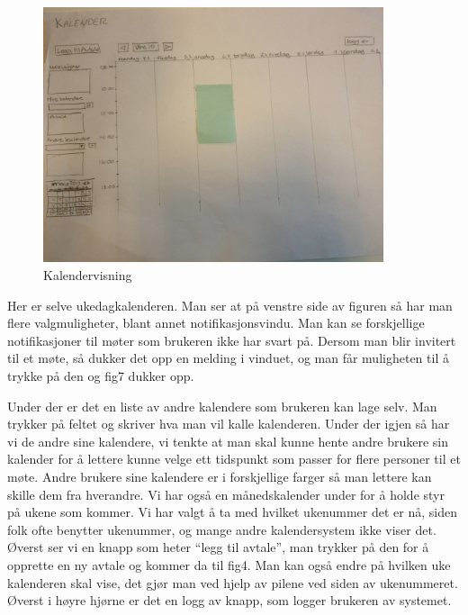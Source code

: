 \begin{figure}[ht!]
\includegraphics[width=100mm]{fig3.jpg}
\caption{Kalendervisning}
\end{figure}
Her er selve ukedagkalenderen. Man ser at på venstre side av figuren så har man flere valgmuligheter, blant annet notifikasjonsvindu. Man kan se forskjellige notifikasjoner til møter som brukeren ikke har svart på. Dersom man blir invitert til et møte, så dukker det opp en melding i vinduet, og man får muligheten til å trykke på den og fig7 dukker opp. 

Under der er det en liste av andre kalendere som brukeren kan lage selv. Man trykker på feltet og skriver hva man vil kalle kalenderen. Under der igjen så har vi de andre sine kalendere, vi tenkte at man skal kunne hente andre brukere sin kalender for å lettere kunne velge ett tidspunkt som passer for flere personer til et møte. Andre brukere sine kalendere er i forskjellige farger så man lettere kan skille dem fra hverandre. Vi har også en månedskalender under for å holde styr på ukene som kommer. Vi har valgt å ta med hvilket ukenummer det er nå, siden folk ofte benytter ukenummer, og mange andre kalendersystem ikke viser det. Øverst ser vi en knapp som heter “legg til avtale”, man trykker på den for å opprette en ny avtale og kommer da til fig4. Man kan også endre på hvilken uke kalenderen skal vise, det gjør man ved hjelp av pilene ved siden av ukenummeret. Øverst i høyre hjørne er det en logg av knapp, som logger brukeren av systemet.

\newpage

